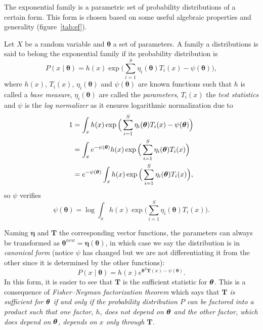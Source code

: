 
The exponential family is a parametric set of probability distributions of a certain form. This form is chosen based on some useful algebraic properties and generality (figure~\ref{tab:ef}).

Let \(X\) be a random variable and \(\bm{\theta}\) a set of parameters. A family a distributions is said to belong the exponential family if its probability distribution is
\[
  P(x \mid \bm{\theta}) = h(x)\exp{\Big( \sum_{i=1}^{S} \eta_{i}(\bm{\theta})T_{i}(x) - \psi(\bm{\theta}) \Big)},
\]
where \(h(x)\), \(T_{i}(x)\), \(\eta_{i}(\bm{\theta})\) and \(\psi(\bm{\theta})\)  are known functions such that \(h\) is called a \emph{base measure}, \(\eta_{i}(\bm{\theta})\) are called the \emph{parameters},  \(T_{i}(x)\) the \emph{test statistics} and \(\psi\) is the \emph{log normalizer} as it ensures logarithmic normalization due to
\[
  \begin{aligned}
    1 &= \int_{x}  h(x)\exp{\Big( \sum_{i=1}^{S} \eta_{i}(\bm{\theta})T_{i}(x) - \psi(\bm{\theta}) \Big)}\\
    &= \int_{x} e^{-\psi(\bm{\theta})} h(x)\exp{\Big( \sum_{i=1}^{S} \eta_{i}(\bm{\theta})T_{i}(x) \Big)}\\
    &= e^{-\psi(\bm{\theta})} \int_{x} h(x)\exp{\Big( \sum_{i=1}^{S} \eta_{i}(\bm{\theta})T_{i}(x) \Big)},
  \end{aligned}
\]
so \(\psi\) verifies
\[
      \psi(\bm{\theta}) = \log \int_{x} h(x) \exp \Big( \sum_{i=1}^{S} \eta_{i}(\bm{\theta})T_{i}(x) \Big).
\]

Naming \(\bm{\eta}\) and \(\bm{T}\) the corresponding vector functions, the parameters can always be transformed as \(\bm{\theta}^{new} = \bm{\eta}(\bm{\theta})\), in which case we say the distribution is in \emph{canonical form} (notice \(\psi\) has changed but we are not differentiating it from the other since it is determined by the other functions):
\[
  P(x \mid \bm{\theta}) = h(x) e^{\bm{\theta}^{T}\bm{T}(x) - \psi(\bm{\theta})}.
\]
In this form, it is easier to see that \(\bm{T}\) is the sufficient statistic for \(\bm{\theta}\). This is a consequence of \emph{Fisher–Neyman factorization theorem} which says that \textit{\(\bm{T}\) is sufficient for \(\bm{\theta}\)  if and only if the probability distribution \(P\)  can be factored into a product such that one factor, \(h\), does not depend on \(\bm{\theta}\)  and the other factor, which does depend on \(\bm{\theta}\), depends on \(x\)  only through \(\bm{T}\).}

